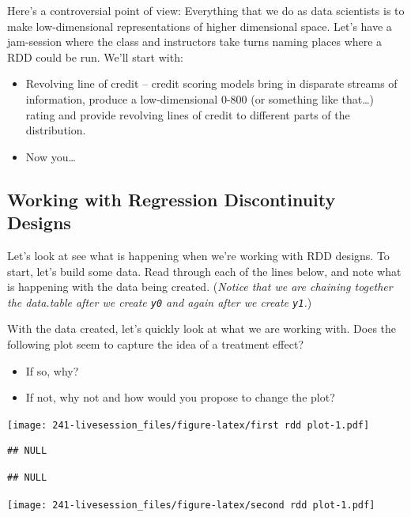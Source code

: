 \documentclass[
]{book}
\begin{document}
Here's a controversial point of view: Everything that we do as data
scientists is to make low-dimensional representations of higher
dimensional space. Let's have a jam-session where the class and
instructors take turns naming places where a RDD could be run. We'll
start with:

\begin{itemize}
\item
  Revolving line of credit -- credit scoring models bring in disparate
  streams of information, produce a low-dimensional 0-800 (or something
  like that\ldots) rating and provide revolving lines of credit to
  different parts of the distribution.
\item
  Now you\ldots{}
\end{itemize}

\hypertarget{working-with-regression-discontinuity-designs}{%
\subsection{Working with Regression Discontinuity
Designs}\label{working-with-regression-discontinuity-designs}}

Let's look at see what is happening when we're working with RDD designs.
To start, let's build some data. Read through each of the lines below,
and note what is happening with the data being created. (\emph{Notice
that we are chaining together the data.table after we create \texttt{y0}
and again after we create \texttt{y1}.})

With the data created, let's quickly look at what we are working with.
Does the following plot seem to capture the idea of a treatment effect?

\begin{itemize}
\item
  If so, why?
\item
  If not, why not and how would you propose to change the plot?
\end{itemize}

\texttt{[image: 241-livesession\_files/figure-latex/first rdd plot-1.pdf]}

\begin{verbatim}
## NULL
\end{verbatim}

\begin{verbatim}
## NULL
\end{verbatim}

\texttt{[image: 241-livesession\_files/figure-latex/second rdd plot-1.pdf]}
\end{document}
